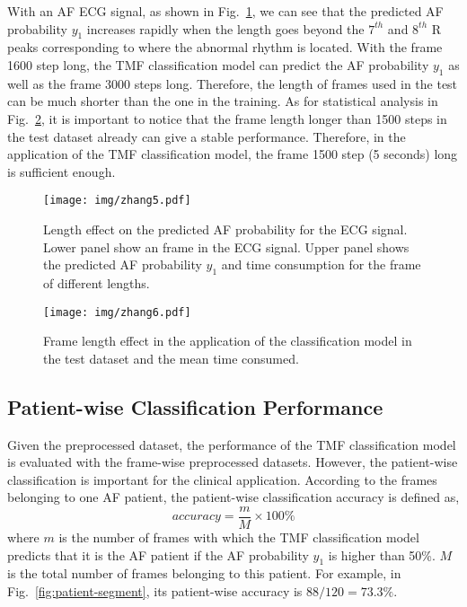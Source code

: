 \documentclass[journal]{IEEEtran}
\begin{document}
With an AF ECG signal, as shown in Fig.~\ref{fig:flexibility}, we can see that the predicted AF probability $y_1$ increases rapidly when the length goes beyond the $7^{th}$ and $8^{th}$ R peaks corresponding to where the abnormal rhythm is located. With the frame 1600 step long,  the TMF classification model can predict the AF probability $y_1$ as well as the frame 3000 steps long. Therefore, the length of frames used in the test can be much shorter than the one in the training. As for statistical analysis in Fig.~\ref{fig:length_effect}, it is important to notice that the frame length longer than 1500 steps in the test dataset already can give a stable performance. Therefore, in the application of the TMF classification model, the frame 1500 step (5 seconds) long is sufficient enough. 
\begin{figure}[ht]
  \centering
  \texttt{[image: img/zhang5.pdf]}
  \caption{Length effect on the predicted AF probability for the ECG signal. Lower panel show an frame in the ECG signal. Upper panel shows the predicted AF probability $y_1$ and time consumption for the frame of different lengths.}
  \label{fig:flexibility}
\end{figure}


\begin{figure}[ht]
  \centering
  \texttt{[image: img/zhang6.pdf]}
  \caption{Frame length effect in the application of the classification model in the test dataset and the mean time consumed.}
  \label{fig:length_effect}
\end{figure}

\subsection{Patient-wise Classification Performance}\label{patient-wise}
Given the preprocessed dataset, the performance of the TMF classification model is evaluated with the frame-wise preprocessed datasets. 
However, the patient-wise classification is important for the clinical application. According to the frames belonging to one AF patient, the patient-wise classification accuracy is defined as,
\begin{equation}
  accuracy = \frac{m}{M} \times 100 \%
\end{equation}
where $m$ is the number of frames with which the TMF classification model predicts that it is the AF patient if the AF probability $y_1$ is higher than 50\%. $M$ is the total number of frames belonging to this patient.  For example, in Fig.~\ref{fig:patient-segment}, its patient-wise accuracy is $88/120=73.3\%$.
\end{document}
